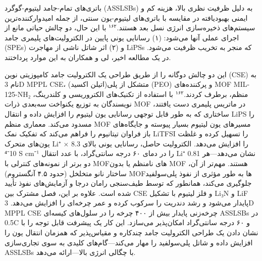 \documentclass[12pt,a4paper,twocolumn]{article} %
\newcommand{\persian}[1]{\textfarsi{#1}}
\newcommand{\english}[1]{\textenglish{#1}}
\begin{document}
\persian{
باتری‌های تمام-جامد لیتیوم-گوگرد (\english{ASSLSBs}) به دلیل ظرفیت نظری بالا، هزینه کم و ایمنی بهبودیافته در مقایسه با باتری‌های لیتیوم-یون سنتی، از جمله امیدوارکننده‌ترین سیستم‌های ذخیره‌سازی انرژی نسل بعد هستند.$^{۱۶۲}$ با این حال، دو چالش حیاتی مانع از اجرای عملی آنها می‌شود: (۱) رسانایی یونی پایین در الکترولیت‌های پلیمری جامد (\english{SPEs}) و (۲) اثر شاتل ناشی از مهاجرت \english{LiPSs} که منجر به تخریب ظرفیت می‌شود. در یک مطالعه اخیر، لی و همکاران به این موارد پرداختند.
}

\persian{
این دو چالش دوگانه را از طریق طراحی یک الکترولیت جامد کامپوزیتی نوین (\english{CSE}) به نام \english{3D MPPL CSE}، متشکل از پلی(اتیلن اکسید) (\english{PEO}) و پرکننده‌های \english{MOF} \english{MIL-125-NH₂} منظم، برطرف کردند.$^{۱۶۲}$ با استفاده از تکنیک‌های الکتروریسی و کلندرینگ، نویسندگان به توزیع یکنواخت سه‌بعدی ذرات \english{MOF} در ماتریس پلیمری دست یافتند، ساختاری که به طور قابل توجهی رسانایی یون لیتیوم را افزایش داده و انتقال \english{LiPS} را مسدود می‌کند. معماری منظم \english{MOF} مسیرهای یون لیتیوم بسیار پیوسته و جایگاه‌های باز فراوان تیتانیوم را فراهم می‌کند که تفکیک نمک \english{LiTFSI} را تسهیل کرده و غلظت یون‌های متحرک \english{Li⁺} را افزایش می‌دهد. الکترولیت حاصل، رسانایی یونی بالای \english{8.3 × 10⁻⁴ S cm⁻¹} را در دمای ۶۰ درجه سانتی‌گراد، با عدد انتقال \english{Li⁺} \english{0.81} نشان می‌دهد—هر دو برتر از نمونه‌های کنترلی با \english{MOF}های نامنظم یا بدون \english{MOF} هستند. مهم‌تر از آن، ساختار نانو متخلخل (حدود ۴.۵ آنگستروم) \english{MOF}ها به طور مؤثری از نفوذ پلی‌سولفید جلوگیری می‌کند، همانطور که توسط طیف‌سنجی رامان درجا و آزمایش‌های نفوذ تأیید شده است. علاوه بر این، فصل مشترک بین \english{CSE} و فلز لیتیوم با تشکیل \english{Li₃N} و \english{LiF} پایدار می‌شود و رشد دندریت را سرکوب کرده و عمر چرخه‌ای را افزایش می‌دهد. \english{3D MPPL CSE} چرخه‌زنی پایدار بیش از ۴۰۰ چرخه را در سلول‌های کیسه‌ای \english{ASSLSBs} در \english{0.5C} و ۶۰ درجه سانتی‌گراد امکان‌پذیر می‌سازد. این کار یک پیشرفت قابل توجه را با نشان دادن یک طراحی الکترولیت جامد چندکاره و مقیاس‌پذیر که همزمان انتقال یون را افزایش داده و شاتل پلی‌سولفید را مهار می‌کند—گام‌های کلیدی به سوی تجاری‌سازی \english{ASSLSBs} با چگالی انرژی بالا—ارائه می‌دهد.
}
\end{document}
